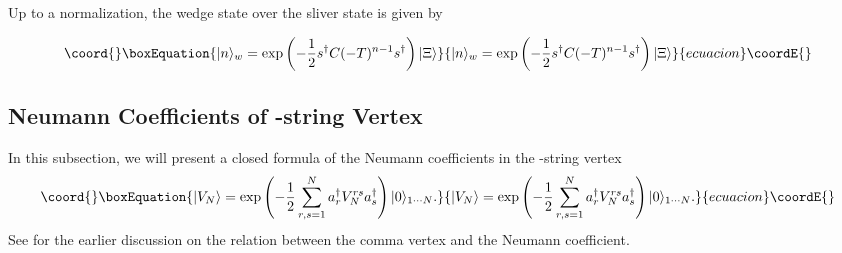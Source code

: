 \documentclass[a4paper,12pt]{article}
\def\hf{{1\over 2}}
\def\ket{\rangle}
\def\lf{\left}
\def\ri{\right}
\def\dag{\dagger}
\def\a{a^{\dag}}
\def\sd{s^{\dagger}}
\begin{document}
Up to a normalization, the wedge state over the sliver state is given by

\begin{equation}\coord{}\boxEquation{
|n\ket_w=\exp\lf(-\hf\sd C(-T)^{n-1}\sd\ri)|\Xi\ket 
}{
|n\ket_w=\exp\lf(-\hf\sd C(-T)^{n-1}\sd\ri)|\Xi\ket 
}{ecuacion}\coordE{}\end{equation}


\subsection{Neumann Coefficients of \coordHE{}-string Vertex}
In this subsection, we will present a closed formula 
of the Neumann coefficients \coordHE{} in the \coordHE{}-string vertex
\begin{equation}\coord{}\boxEquation{
|V_N\ket=\exp\lf(-\hf \sum_{r,s=1}^N\a_rV^{rs}_N\a_s\ri)|0\ket_{1\cdots N}.
}{
|V_N\ket=\exp\lf(-\hf \sum_{r,s=1}^N\a_rV^{rs}_N\a_s\ri)|0\ket_{1\cdots N}.
}{ecuacion}\coordE{}\end{equation}
See \cite{CommaN} for the earlier discussion on the relation between 
the comma vertex and the Neumann coefficient.
\end{document}
